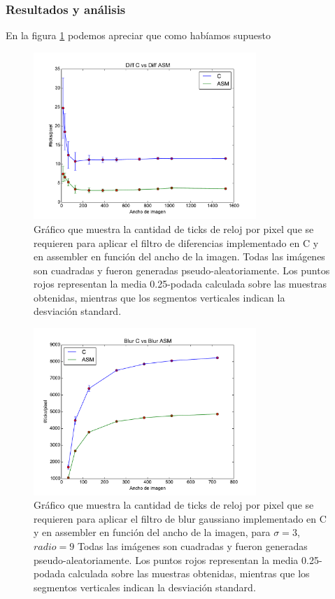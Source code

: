 \subsubsection*{Resultados y análisis}
En la figura \ref{fig:exp.diff} podemos apreciar que como habíamos supuesto  

\begin{figure}
 	\centering
 	\includegraphics[width=0.75\textwidth]{../graficos/diff_gcc.pdf}
	\caption{\footnotesize Gráfico que muestra la cantidad de ticks de reloj por pixel que se requieren para aplicar el filtro de diferencias implementado en C y en assembler en función del ancho de la imagen. Todas las imágenes son cuadradas y fueron generadas pseudo-aleatoriamente. Los puntos rojos representan la media 0.25-podada calculada sobre las muestras obtenidas, mientras que los segmentos verticales indican la desviación standard.}
	\label{fig:exp.diff}
\end{figure}

\begin{figure}
 	\centering
 	\includegraphics[width=0.75\textwidth]{../graficos/blur_v2_lineplot_3-9.pdf}
	\caption{\footnotesize Gráfico que muestra la cantidad de ticks de reloj por pixel que se requieren para aplicar el filtro de blur gaussiano implementado en C y en assembler en función del ancho de la imagen, para $\sigma = 3$, $radio = 9$ Todas las imágenes son cuadradas y fueron generadas pseudo-aleatoriamente. Los puntos rojos representan la media 0.25-podada calculada sobre las muestras obtenidas, mientras que los segmentos verticales indican la desviación standard.}
	\label{fig:lineplot.diff}
\end{figure}

